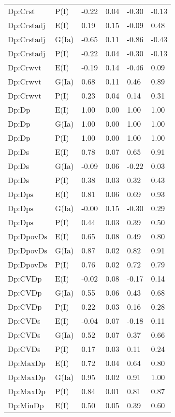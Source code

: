 \begin{center}
\begin{longtable}{|p{1.1in}|p{0.7in}|p{0.7in}|p{0.6in}|p{0.6in}|p{0.6in}|}
  Dp:Crst & P(I) & -0.22 & 0.04 & -0.30 & -0.13 \\ 
  Dp:Crstadj & E(I) & 0.19 & 0.15 & -0.09 & 0.48 \\ 
  Dp:Crstadj & G(Ia) & -0.65 & 0.11 & -0.86 & -0.43 \\ 
  Dp:Crstadj & P(I) & -0.22 & 0.04 & -0.30 & -0.13 \\ 
  Dp:Crwvt & E(I) & -0.19 & 0.14 & -0.46 & 0.09 \\ 
  Dp:Crwvt & G(Ia) & 0.68 & 0.11 & 0.46 & 0.89 \\ 
  Dp:Crwvt & P(I) & 0.23 & 0.04 & 0.14 & 0.31 \\ 
  Dp:Dp & E(I) & 1.00 & 0.00 & 1.00 & 1.00 \\ 
  Dp:Dp & G(Ia) & 1.00 & 0.00 & 1.00 & 1.00 \\ 
  Dp:Dp & P(I) & 1.00 & 0.00 & 1.00 & 1.00 \\ 
  Dp:Ds & E(I) & 0.78 & 0.07 & 0.65 & 0.91 \\ 
  Dp:Ds & G(Ia) & -0.09 & 0.06 & -0.22 & 0.03 \\ 
  Dp:Ds & P(I) & 0.38 & 0.03 & 0.32 & 0.43 \\ 
  Dp:Dps & E(I) & 0.81 & 0.06 & 0.69 & 0.93 \\ 
  Dp:Dps & G(Ia) & -0.00 & 0.15 & -0.30 & 0.29 \\ 
  Dp:Dps & P(I) & 0.44 & 0.03 & 0.39 & 0.50 \\ 
  Dp:DpovDs & E(I) & 0.65 & 0.08 & 0.49 & 0.80 \\ 
  Dp:DpovDs & G(Ia) & 0.87 & 0.02 & 0.82 & 0.91 \\ 
  Dp:DpovDs & P(I) & 0.76 & 0.02 & 0.72 & 0.79 \\ 
  Dp:CVDp & E(I) & -0.02 & 0.08 & -0.17 & 0.14 \\ 
  Dp:CVDp & G(Ia) & 0.55 & 0.06 & 0.43 & 0.68 \\ 
  Dp:CVDp & P(I) & 0.22 & 0.03 & 0.16 & 0.28 \\ 
  Dp:CVDs & E(I) & -0.04 & 0.07 & -0.18 & 0.11 \\ 
  Dp:CVDs & G(Ia) & 0.52 & 0.07 & 0.37 & 0.66 \\ 
  Dp:CVDs & P(I) & 0.17 & 0.03 & 0.11 & 0.24 \\ 
  Dp:MaxDp & E(I) & 0.72 & 0.04 & 0.64 & 0.80 \\ 
  Dp:MaxDp & G(Ia) & 0.95 & 0.02 & 0.91 & 1.00 \\ 
  Dp:MaxDp & P(I) & 0.84 & 0.01 & 0.81 & 0.87 \\ 
  Dp:MinDp & E(I) & 0.50 & 0.05 & 0.39 & 0.60 \\ 

\end{longtable}
\end{center}

